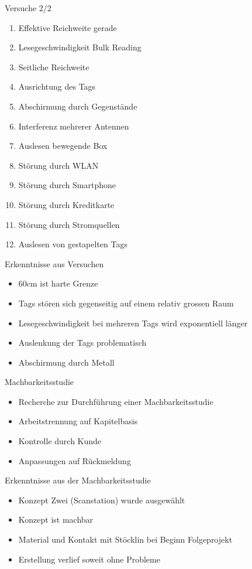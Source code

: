 \documentclass{beamer}
\begin{document}
\begin{frame}{Versuche 2/2}
\begin{enumerate}
    \item Effektive Reichweite gerade
    \item Lesegeschwindigkeit Bulk Reading
    \item Seitliche Reichweite
    \item Ausrichtung des Tags
    \item Abschirmung durch Gegenstände
    \item Interferenz mehrerer Antennen
    \item Auslesen bewegende Box
    \item Störung durch WLAN
    \item Störung durch Smartphone
    \item Störung durch Kreditkarte
    \item Störung durch Stromquellen
    \item Auslesen von gestapelten Tags
\end{enumerate}
\end{frame}
\begin{frame}{Erkenntnisse aus Versuchen}
\begin{itemize}
    \item 60cm ist harte Grenze
    \item Tags stören sich gegenseitig auf einem relativ grossen Raum
    \item Lesegeschwindigkeit bei mehreren Tags wird exponentiell länger
    \item Auslenkung der Tags problematisch
    \item Abschirmung durch Metall
\end{itemize}
\end{frame}
\begin{frame}{Machbarkeitsstudie}
\begin{itemize}
    \item Recherche zur Durchführung einer Machbarkeitsstudie
    \item Arbeitstrennung auf Kapitelbasis
    \item Kontrolle durch Kunde
    \item Anpassungen auf Rückmeldung
\end{itemize}
\end{frame}
\begin{frame}{Erkenntnisse aus der Machbarkeitsstudie}
\begin{itemize}
    \item Konzept Zwei (Scanstation) wurde ausgewählt
    \item Konzept ist machbar
    \item Material und Kontakt mit Stöcklin bei Beginn Folgeprojekt
    \item Erstellung verlief soweit ohne Probleme
\end{itemize}
\end{frame}
\end{document}
